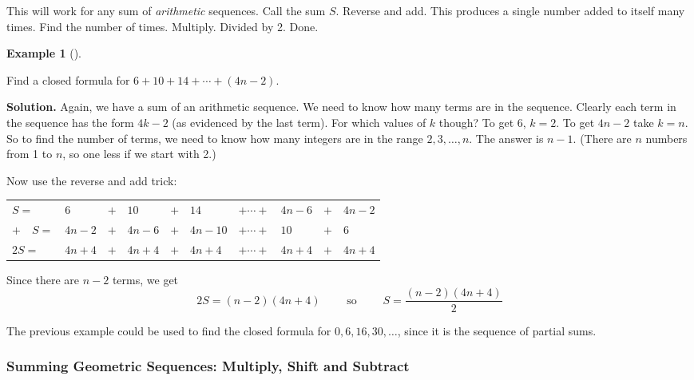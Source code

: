 \documentclass[10pt,]{book}
\theoremstyle{plain}
\theoremstyle{definition}
\newtheorem{example}[theorem]{Example}
\theoremstyle{definition}
\theoremstyle{definition}
\numberwithin{equation}{chapter}
\newcommand{\hrulethin}  {\noalign{\hrule height 0.04em}}
\begin{document}
        This will work for any sum of \emph{arithmetic} sequences. Call the sum \(S\). Reverse and add. This produces a single number added to itself many times. Find the number of times. Multiply. Divided by 2. Done.
\begin{example}[]\label{example-64}

            Find a closed formula for \(6 + 10 + 14 + \cdots + (4n - 2)\).
\par\medskip\noindent%
\textbf{Solution.}\quad
            Again, we have a sum of an arithmetic sequence. We need to know how many terms are in the sequence. Clearly each term in the sequence has the form \(4k -2\) (as evidenced by the last term). For which values of \(k\) though? To get 6, \(k = 2\). To get \(4n-2\) take \(k = n\). So to find the number of terms, we need to know how many integers are in the range \(2,3,\ldots, n\). The answer is \(n-1\). (There are \(n\) numbers from 1 to \(n\), so one less if we start with 2.)
\par

            Now use the reverse and add trick:
\leavevmode%
\begin{table}
\centering
\begin{tabular}{llllllllll}
\(S  =\)&\(6\)&\(+\)&\(10\)&\(+\)&\(14\)&\(+ \cdots +\)&\(4n-6\)&\(+\)&\(4n-2\)\tabularnewline[0pt]
\(+ \quad S  =\)&\(4n-2\)&\(+\)&\(4n-6\)&\(+\)&\(4n-10\)&\(+ \cdots +\)&\(10\)&\(+\)&6\tabularnewline\hrulethin
\(2S  =\)&\(4n+4\)&\(+\)&\(4n+4\)&\(+\)&\(4n+4\)&\(+ \cdots +\)&\(4n+4\)&\(+\)&\(4n+4\)
\end{tabular}
\end{table}
\par

            Since there are \(n-2\) terms, we get
            \begin{equation*}
              2S = (n-2)(4n+4)\qquad \mbox{ so } \qquad S = \frac{(n-2)(4n+4)}{2}
            \end{equation*}
\end{example}
\par

        The previous example could be used to find the closed formula for \(0, 6, 16, 30, \ldots\), since it is the sequence of partial sums.
\typeout{************************************************}
\typeout{************************************************}
\subsubsection[Summing Geometric Sequences: Multiply, Shift and Subtract]{Summing Geometric Sequences: Multiply, Shift and Subtract}\label{subsubsection-2}
\end{document}
